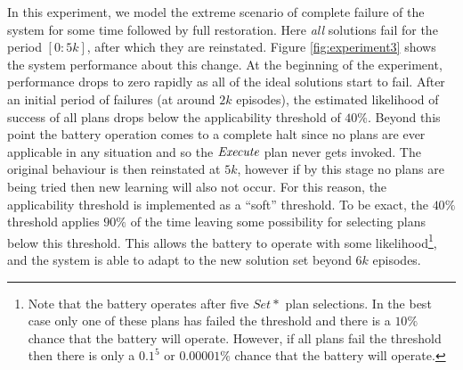 In this experiment, we model the extreme scenario of complete failure of the system for some time followed by full restoration. Here {\em all} solutions fail for the period $[0:5k]$, after which they are reinstated. Figure \ref{fig:experiment3} shows the system performance about this change. At the beginning of the experiment, performance drops to zero rapidly as all of the ideal solutions start to fail. After an initial period of failures (at around $2k$ episodes), the estimated likelihood of success of all plans drops below the applicability threshold of $40\%$. Beyond this point the battery operation comes to a complete halt since no plans are ever applicable in any situation and so the $\operatorname{\textit{Execute}}$ plan never gets invoked. The original behaviour is then reinstated at $5k$, however if by this stage no plans are being tried then new learning will also not occur. For this reason, the applicability threshold is implemented as a ``soft'' threshold. To be exact, the $40\%$ threshold applies $90\%$ of the time leaving some possibility for selecting plans below this threshold. This allows the battery to operate with some likelihood\footnote{Note that the battery operates after five $Set*$ plan selections. In the best case only one of these plans has failed the threshold and there is a $10\%$ chance that the battery will operate. However, if all plans fail the threshold then there is only a $0.1^5$ or $0.00001\%$ chance that the battery will operate.}, and the system is able to adapt to the new solution set beyond $6k$ episodes.


%

